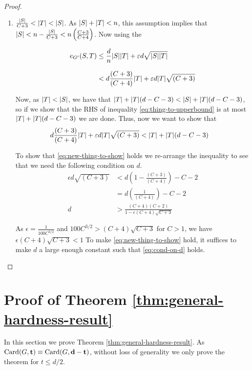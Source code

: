 \documentclass[11pt]{article}
\begin{document}
\begin{proof}
\begin{enumerate}
\item{
$ \frac{\Size{S}}{C+3} < \Size{T} < \Size{S}$. As $\Size{S} + \Size{T} < n$, this assumption implies that $\Size{S} < n - \frac{\Size{S}}{C+3} < n\left(\frac{C+3}{C+4}\right)$.
Now using the 

\begin{align}
\CutEdges{S}{T}{G'} &\le \frac{d}{n}\Size{S}\Size{T} + \epsilon d \sqrt{\Size{S}\Size{T}}	\\[8pt]
&< d\frac{(C+3)}{(C+4)}\Size{T} + \epsilon d \Size{T}\sqrt{(C+3)} \label{eq:thing-to-upperbound}
\end{align}

Now, as $\Size{T} < \Size{S}$, we have that $\Size{T} + \Size{T}(d-C-3) < \Size{S} + \Size{T}(d-C-3)$, so if we show that the RHS of inequality \eqref{eq:thing-to-upperbound} is at most $\Size{T} + \Size{T}(d-C-3)$ we are done.
Thus, now we want to show that 
\begin{align}
d\frac{(C+3)}{(C+4)}\Size{T} + \epsilon d \Size{T}\sqrt{(C+3)} &< 	\Size{T} + \Size{T}(d-C-3) \label{eq:new-thing-to-show}
\end{align}

To show that \eqref{eq:new-thing-to-show} holds we re-arrange the inequality to see that we need the following condition on $d$.
\begin{align}
 \epsilon d \sqrt{(C+3)} &< d\left(1 - \frac{(C+3)}{(C+4)}\right) -C-2 \\[8pt]
 &= d\left(\frac{1}{(C+4)}\right) -C-2 \\[8pt]
 d&> \frac{(C+4)(C+2)}{1 - \epsilon(C+4)\sqrt{C+3}} \label{eq:cond-on-d}
\end{align} 

As $\epsilon = \frac{1}{100C^{3/2}}$ and $100C^{3/2} > (C+4)\sqrt{C+3}$ for $C>1$, we have $\epsilon(C+4)\sqrt{C+3} < 1$
To make \eqref{eq:new-thing-to-show} hold, it suffices to make $d$ a large enough constant such that \eqref{eq:cond-on-d} holds.
  }
  
\end{enumerate}
\end{proof}  



\section{Proof of Theorem \ref{thm:general-hardness-result}}
\label{sec:main-proof}

In this section we prove Theorem \ref{thm:general-hardness-result}. As $\Card{G, \vec{t}} \equiv \Card{G, \vec{d-t}}$, without loss of generality we only prove the theorem for $t \le d/2$. 
\end{document}
